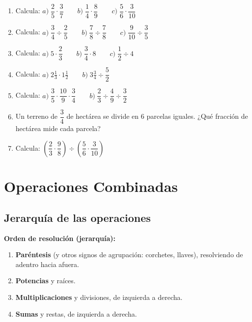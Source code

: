 \documentclass[12pt, letterpaper]{article}
\begin{document}
\begin{enumerate}[leftmargin=*, resume]
  \item \facil{} Calcula: $a) \; \dfrac{2}{5} \cdot \dfrac{3}{7} \qquad b) \; \dfrac{1}{4} \cdot \dfrac{8}{9} \qquad c) \; \dfrac{5}{6} \cdot \dfrac{3}{10}$

  \item \facil{} Calcula: $a) \; \dfrac{3}{4} \div \dfrac{2}{5} \qquad b) \; \dfrac{7}{8} \div \dfrac{7}{8} \qquad c) \; \dfrac{9}{10} \div \dfrac{3}{5}$

  \item \facil{} Calcula: $a) \; 5 \cdot \dfrac{2}{3} \qquad b) \; \dfrac{3}{4} \cdot 8 \qquad c) \; \dfrac{1}{2} \div 4$

  \item \medio{} Calcula: $a) \; 2\frac{1}{3} \cdot 1\frac{1}{2} \qquad b) \; 3\frac{3}{4} \div \dfrac{5}{2}$

  \item \medio{} Calcula: $a) \; \dfrac{3}{5} \cdot \dfrac{10}{9} \cdot \dfrac{3}{4} \qquad b) \; \dfrac{2}{3} \div \dfrac{4}{9} \div \dfrac{3}{2}$

  \item \medio{} Un terreno de $\dfrac{3}{4}$ de hectárea se divide en 6 parcelas iguales. ¿Qué fracción de hectárea mide cada parcela?

  \item \dificil{} Calcula: $\left(\dfrac{2}{3} \cdot \dfrac{9}{8}\right) \div \left(\dfrac{5}{6} \cdot \dfrac{3}{10}\right)$
\end{enumerate}


\section{Operaciones Combinadas}

\subsection{Jerarquía de las operaciones}

\begin{cuadroteoria}
  \textbf{Orden de resolución (jerarquía):}
  \begin{enumerate}[leftmargin=*]
    \item \textbf{Paréntesis} (y otros signos de agrupación: corchetes, llaves), resolviendo de adentro hacia afuera.
    \item \textbf{Potencias} y raíces.
    \item \textbf{Multiplicaciones} y divisiones, de izquierda a derecha.
    \item \textbf{Sumas} y restas, de izquierda a derecha.
  \end{enumerate}
\end{cuadroteoria}
\end{document}
